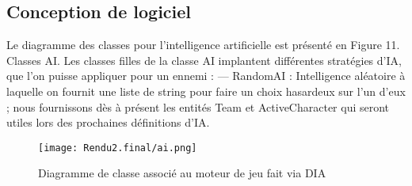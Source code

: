 \documentclass[a4paper,12pt]{article}
\begin{document}
\newpage
\subsection{Conception de logiciel}
Le diagramme des classes pour l’intelligence artificielle est présenté en Figure 11.
Classes AI. Les classes filles de la classe AI implantent différentes stratégies d’IA, que l’on puisse appliquer pour un ennemi :
— RandomAI : Intelligence aléatoire à laquelle on fournit une liste de string pour faire un choix hasardeux sur l'un d'eux ; nous fournissons dès à présent les entités Team et ActiveCharacter qui seront utiles lors des prochaines définitions d'IA.

\begin{figure}[!ht]
  \centering
  \texttt{[image: Rendu2.final/ai.png]}
  \caption{Diagramme de classe associé au moteur de jeu fait via DIA}
\end{figure}
\end{document}
